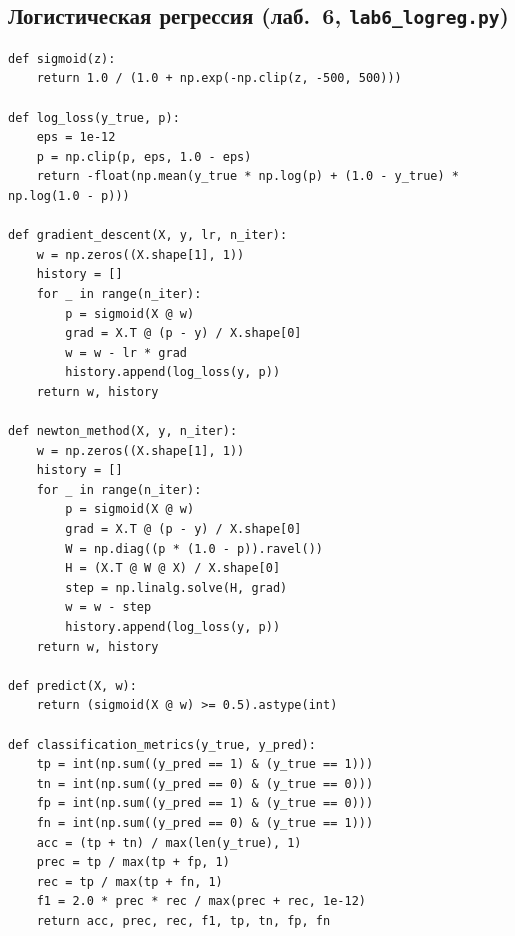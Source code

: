 \documentclass[12pt,a4paper]{article}
\begin{document}
\subsection{Логистическая регрессия (лаб.~6, \texttt{lab6\_logreg.py})}
\begin{lstlisting}
def sigmoid(z):
    return 1.0 / (1.0 + np.exp(-np.clip(z, -500, 500)))

def log_loss(y_true, p):
    eps = 1e-12
    p = np.clip(p, eps, 1.0 - eps)
    return -float(np.mean(y_true * np.log(p) + (1.0 - y_true) * np.log(1.0 - p)))

def gradient_descent(X, y, lr, n_iter):
    w = np.zeros((X.shape[1], 1))
    history = []
    for _ in range(n_iter):
        p = sigmoid(X @ w)
        grad = X.T @ (p - y) / X.shape[0]
        w = w - lr * grad
        history.append(log_loss(y, p))
    return w, history

def newton_method(X, y, n_iter):
    w = np.zeros((X.shape[1], 1))
    history = []
    for _ in range(n_iter):
        p = sigmoid(X @ w)
        grad = X.T @ (p - y) / X.shape[0]
        W = np.diag((p * (1.0 - p)).ravel())
        H = (X.T @ W @ X) / X.shape[0]
        step = np.linalg.solve(H, grad)
        w = w - step
        history.append(log_loss(y, p))
    return w, history

def predict(X, w):
    return (sigmoid(X @ w) >= 0.5).astype(int)

def classification_metrics(y_true, y_pred):
    tp = int(np.sum((y_pred == 1) & (y_true == 1)))
    tn = int(np.sum((y_pred == 0) & (y_true == 0)))
    fp = int(np.sum((y_pred == 1) & (y_true == 0)))
    fn = int(np.sum((y_pred == 0) & (y_true == 1)))
    acc = (tp + tn) / max(len(y_true), 1)
    prec = tp / max(tp + fp, 1)
    rec = tp / max(tp + fn, 1)
    f1 = 2.0 * prec * rec / max(prec + rec, 1e-12)
    return acc, prec, rec, f1, tp, tn, fp, fn
\end{lstlisting}
\end{document}
